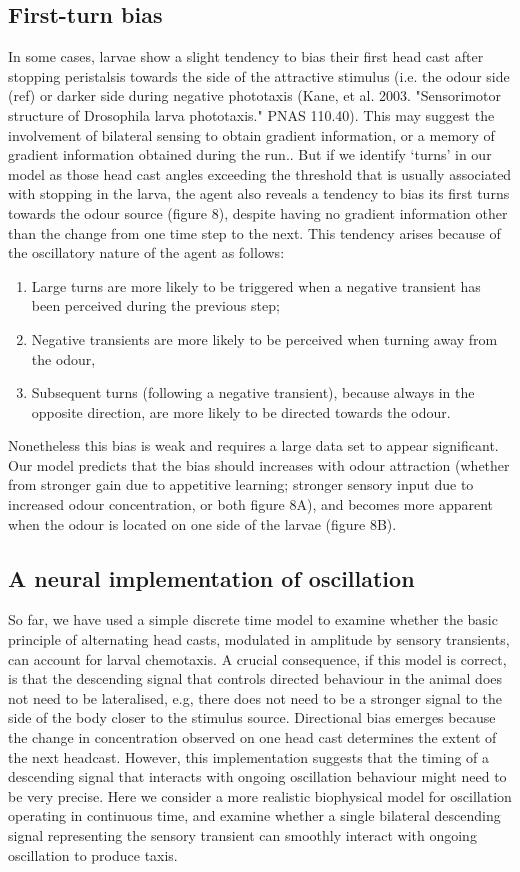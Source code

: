 \documentclass[10pt,a4paper]{article}
\begin{document}
\subsection{First-turn bias}
 In some cases, larvae show a slight tendency to bias their first head cast after stopping peristalsis towards the side of the attractive stimulus (i.e. the odour side (ref) or darker side during negative phototaxis (Kane, et al. 2003. "Sensorimotor structure of Drosophila larva phototaxis." PNAS 110.40). This may suggest the involvement of bilateral sensing to obtain gradient information, or a memory of gradient information obtained during the run.. But if we identify ‘turns’ in our model as those head cast angles exceeding the threshold that is usually associated with stopping in the larva, the agent also reveals a tendency to bias its first turns towards the odour source (figure 8), despite having no gradient information other than the change from one time step to the next. This tendency arises because of the oscillatory nature of the agent as follows:
\begin{enumerate}
\item Large turns are more likely to be triggered when a negative transient has been perceived during the previous step; 
\item Negative transients are more likely to be perceived when turning away from the odour, 
\item Subsequent turns (following a negative transient), because always in the opposite direction, are more likely to be directed towards the odour. 
\end{enumerate}
Nonetheless this bias is weak and requires a large data set to appear significant. Our model predicts that the bias should  increases with odour attraction (whether from stronger gain due to appetitive learning; stronger sensory input due to increased odour concentration, or both figure 8A), and becomes more apparent when the odour is located on one side of the larvae (figure 8B).

\subsection{A neural implementation of oscillation}
So far, we have used a simple discrete time model to examine whether the basic principle of alternating head casts, modulated in amplitude by sensory transients, can account for larval chemotaxis. A crucial consequence, if this model is correct, is that the descending signal that controls directed behaviour in the animal does not need to be lateralised, e.g, there does not need to be a stronger signal to the side of the body closer to the stimulus source. Directional bias emerges because the change in concentration observed on one head cast determines the extent of the next headcast. However, this implementation suggests that the timing of a descending signal that interacts with ongoing oscillation behaviour might need to be very precise. Here we consider a more realistic biophysical model for oscillation operating in continuous time, and examine whether a single bilateral descending signal representing the sensory transient can smoothly interact with ongoing oscillation to produce taxis.
\end{document}
